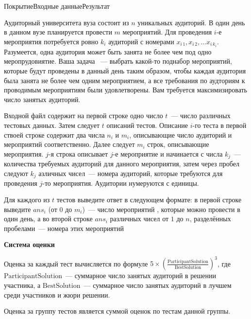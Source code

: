 

\begin{problem}{Покрытие}{Входные данные}{Результат}{}

Аудиторный университета вуза состоит из $n$ уникальных аудиторий. В один день в данном вузе планируется провести $m$ мероприятий. Для проведения $i$-е мероприятия потребуется ровно $k_i$ аудиторий с номерами $x_{i\, 1}, x_{i\, 2}, \ldots x_{i\, k_i}$. Разумеется, одна аудитория может быть занята не более чем под одно меропрудовиятие. Ваша задача ~--- выбрать какой-то поднабор мероприятий, которые будут проведены в данный день таким образом, чтобы каждая аудитория была занята не более чем одним мероприятием, а все требования по аудториям к проводимым мероприятиям были удовлетворены. Вам требуется максимизировать число занятых аудиторий.

\InputFile
Входной файл содержит на первой строке одно число $t$~--- число различных тестовых данных. Затем следует $t$ описаний тестов. Описание $i$-го теста в первой ствоей строке содержит два числа $n_i$ и $m_i$, описывающие число аудиторий и мероприятий соответственно. Далее следует $m_i$ строк, описывающие мероприятия. $j$-я строка описывает $j$-е мероприятие и начинается с числа $k_j$~--- количества требуемых аудиторий для данного мероприятия, затем через пробел следуют $k_j$ азличных чисел~--- номера аудиторий, которые требуются для проведения $j$-то мероприятия. Аудитории нумеруются с единицы. 

\OutputFile
Для каждого из $t$ тестов выведите ответ в следующем формате: в первой строке выведите $ans_i$ (от $0$ до $m_i$)~--- число мероприятий , которые можно провести в один день, а во второй строке $ans_i$ различных чисел от $1$ до $n$, разделённых пробелами~--- номера этих мероприятий


\Examples
\begin{example}
%
\end{example}

{\noindent\bf\problemsectionfont\textsf{Система оценки}}

Оценка за каждый тест вычисляется по формуле $5 \times\left(\frac{\text {ParticipantSolution}}{\text {BestSolution}}\right)^{3}$, где $\text{ParticipantSolution}$~--- суммарное число занятых аудиторий в решении участника, а $\text{BestSolution}$~--- суммарное число занятых аудиторий в лучшем среди участников и жюри решении.

Оценка за группу тестов является суммой оценок по тестам данной группы.


\end{problem}
